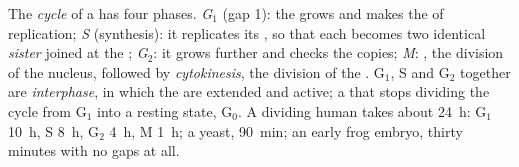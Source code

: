 \begin{definition}\label{def:b1:replication-mitosis:cycle}
The \emph{ cycle} of a  has four phases.
\emph{G$_1$} (gap 1): the  grows and makes the  of
replication; \emph{S} (synthesis): it replicates its , so that each
 becomes two identical \emph{sister } joined at
the ; \emph{G$_2$}: it grows further and checks the copies;
\emph{M}: \emph{}, the division of the nucleus, followed by
\emph{cytokinesis}, the division of the . G$_1$, S and G$_2$
together are \emph{interphase}, in which the  are extended
and active; a  that stops dividing  the cycle from G$_1$
into a resting state, G$_0$. A dividing human  takes about
\qty{24}{h}: G$_1$ \qty{10}{h}, S \qty{8}{h}, G$_2$ \qty{4}{h}, M
\qty{1}{h}; a yeast, \qty{90}{min}; an early frog embryo, thirty
minutes with no gaps at all.
\end{definition}

